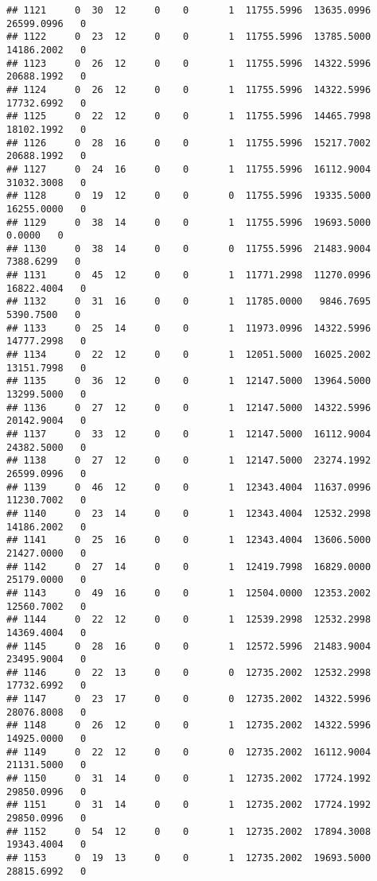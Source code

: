 \documentclass[
]{article}
\begin{document}
\begin{enumerate}
\begin{verbatim}
## 1121     0  30  12     0    0       1  11755.5996  13635.0996  26599.0996   0
## 1122     0  23  12     0    0       1  11755.5996  13785.5000  14186.2002   0
## 1123     0  26  12     0    0       1  11755.5996  14322.5996  20688.1992   0
## 1124     0  26  12     0    0       1  11755.5996  14322.5996  17732.6992   0
## 1125     0  22  12     0    0       1  11755.5996  14465.7998  18102.1992   0
## 1126     0  28  16     0    0       1  11755.5996  15217.7002  20688.1992   0
## 1127     0  24  16     0    0       1  11755.5996  16112.9004  31032.3008   0
## 1128     0  19  12     0    0       0  11755.5996  19335.5000  16255.0000   0
## 1129     0  38  14     0    0       1  11755.5996  19693.5000      0.0000   0
## 1130     0  38  14     0    0       0  11755.5996  21483.9004   7388.6299   0
## 1131     0  45  12     0    0       1  11771.2998  11270.0996  16822.4004   0
## 1132     0  31  16     0    0       1  11785.0000   9846.7695   5390.7500   0
## 1133     0  25  14     0    0       1  11973.0996  14322.5996  14777.2998   0
## 1134     0  22  12     0    0       1  12051.5000  16025.2002  13151.7998   0
## 1135     0  36  12     0    0       1  12147.5000  13964.5000  13299.5000   0
## 1136     0  27  12     0    0       1  12147.5000  14322.5996  20142.9004   0
## 1137     0  33  12     0    0       1  12147.5000  16112.9004  24382.5000   0
## 1138     0  27  12     0    0       1  12147.5000  23274.1992  26599.0996   0
## 1139     0  46  12     0    0       1  12343.4004  11637.0996  11230.7002   0
## 1140     0  23  14     0    0       1  12343.4004  12532.2998  14186.2002   0
## 1141     0  25  16     0    0       1  12343.4004  13606.5000  21427.0000   0
## 1142     0  27  14     0    0       1  12419.7998  16829.0000  25179.0000   0
## 1143     0  49  16     0    0       1  12504.0000  12353.2002  12560.7002   0
## 1144     0  22  12     0    0       1  12539.2998  12532.2998  14369.4004   0
## 1145     0  28  16     0    0       1  12572.5996  21483.9004  23495.9004   0
## 1146     0  22  13     0    0       0  12735.2002  12532.2998  17732.6992   0
## 1147     0  23  17     0    0       0  12735.2002  14322.5996  28076.8008   0
## 1148     0  26  12     0    0       1  12735.2002  14322.5996  14925.0000   0
## 1149     0  22  12     0    0       0  12735.2002  16112.9004  21131.5000   0
## 1150     0  31  14     0    0       1  12735.2002  17724.1992  29850.0996   0
## 1151     0  31  14     0    0       1  12735.2002  17724.1992  29850.0996   0
## 1152     0  54  12     0    0       1  12735.2002  17894.3008  19343.4004   0
## 1153     0  19  13     0    0       1  12735.2002  19693.5000  28815.6992   0

\end{verbatim}
\end{enumerate}
\end{document}
